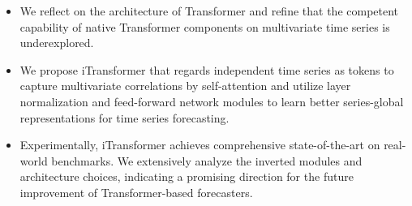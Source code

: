 \documentclass[twoside,12pt]{article}
\begin{document}
\begin{itemize}
  \item We reflect on the architecture of Transformer and refine that the competent capability of native Transformer components on multivariate time series is underexplored.
  \item We propose iTransformer that regards independent time series as tokens to capture multivariate correlations by self-attention and utilize layer normalization and feed-forward network modules to learn better series-global representations for time series forecasting.
  \item Experimentally, iTransformer achieves comprehensive state-of-the-art on real-world benchmarks. We extensively analyze the inverted modules and architecture choices, indicating a promising direction for the future improvement of Transformer-based forecasters.
\end{itemize}




\vfill
\end{document}
